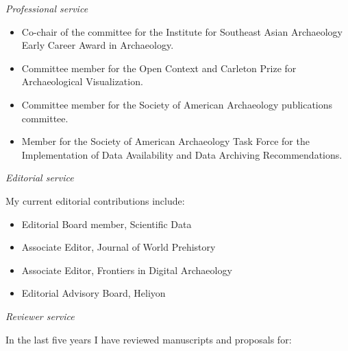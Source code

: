 \medskip

\noindent\emph{Professional service\vspace{0.01in}}

\medskip

\begin{itemize}[noitemsep, font=$\bullet$\scshape\bfseries]

\item Co-chair of the committee for the Institute for Southeast Asian Archaeology Early Career Award in Archaeology.

\item Committee member for the Open Context and Carleton Prize for Archaeological Visualization.

\item Committee member for the Society of American Archaeology publications committee. 

\item Member for the Society of American Archaeology Task Force for the Implementation of Data Availability and Data Archiving Recommendations. 

\end{itemize}

\medskip

\noindent\emph{Editorial service\vspace{0.01in}}

\medskip

My current editorial contributions include: 

\begin{itemize}[noitemsep, font=$\bullet$\scshape\bfseries]
\item Editorial Board member, Scientific Data
\item Associate Editor, Journal of World Prehistory
\item Associate Editor, Frontiers in Digital Archaeology
\item Editorial Advisory Board, Heliyon
\end{itemize}

\medskip

\noindent\emph{Reviewer service\vspace{0.01in}}

\medskip

In the last five years I have reviewed manuscripts and proposals for:

